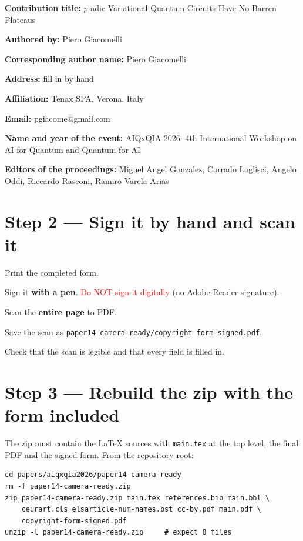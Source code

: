 \documentclass[11pt,a4paper]{article}
\begin{document}
\begin{todo}
  \item \textbf{Contribution title:} $p$-adic Variational Quantum Circuits
    Have No Barren Plateaus
  \item \textbf{Authored by:} Piero Giacomelli
  \item \textbf{Corresponding author name:} Piero Giacomelli
  \item \textbf{Address:} fill in by hand
  \item \textbf{Affiliation:} Tenax SPA, Verona, Italy
  \item \textbf{Email:} pgiacome@gmail.com
  \item \textbf{Name and year of the event:} AIQxQIA 2026: 4th International
    Workshop on AI for Quantum and Quantum for AI
  \item \textbf{Editors of the proceedings:} Miguel Angel Gonzalez, Corrado
    Loglisci, Angelo Oddi, Riccardo Rasconi, Ramiro Varela Arias
\end{todo}

\section*{Step 2 --- Sign it by hand and scan it}
\begin{todo}
  \item Print the completed form.
  \item Sign it \textbf{with a pen}. \textcolor{red}{Do NOT sign it digitally}
    (no Adobe Reader signature).
  \item Scan the \textbf{entire page} to PDF.
  \item Save the scan as
    \texttt{paper14-camera-ready/copyright-form-signed.pdf}.
  \item Check that the scan is legible and that every field is filled in.
\end{todo}

\section*{Step 3 --- Rebuild the zip with the form included}
The zip must contain the LaTeX sources with \texttt{main.tex} at the top
level, the final PDF and the signed form. From the repository root:

\begin{Verbatim}[frame=single,fontsize=\small]
cd papers/aiqxqia2026/paper14-camera-ready
rm -f paper14-camera-ready.zip
zip paper14-camera-ready.zip main.tex references.bib main.bbl \
    ceurart.cls elsarticle-num-names.bst cc-by.pdf main.pdf \
    copyright-form-signed.pdf
unzip -l paper14-camera-ready.zip     # expect 8 files
\end{Verbatim}
\end{document}
